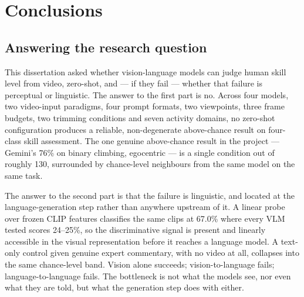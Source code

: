 %
%      

\chapter{Conclusions}

\section{Answering the research question}

This dissertation asked whether vision-language models can judge human skill
level from video, zero-shot, and --- if they fail --- whether that failure is
perceptual or linguistic. The answer to the first part is no. Across four
models, two video-input paradigms, four prompt formats, two viewpoints,
three frame budgets, two trimming conditions and seven activity domains, no
zero-shot configuration produces a reliable, non-degenerate above-chance
result on four-class skill assessment. The one genuine above-chance result
in the project --- Gemini's 76\% on binary climbing, egocentric --- is a
single condition out of roughly 130, surrounded by chance-level neighbours
from the same model on the same task.

The answer to the second part is that the failure is linguistic, and located
at the language-generation step rather than anywhere upstream of it. A
linear probe over frozen CLIP features classifies the same clips at 67.0\%
where every VLM tested scores 24--25\%, so the discriminative signal is
present and linearly accessible in the visual representation before it
reaches a language model. A text-only control given genuine expert
commentary, with no video at all, collapses into the same chance-level band.
Vision alone succeeds; vision-to-language fails; language-to-language fails.
The bottleneck is not what the models see, nor even what they are told, but
what the generation step does with either.


